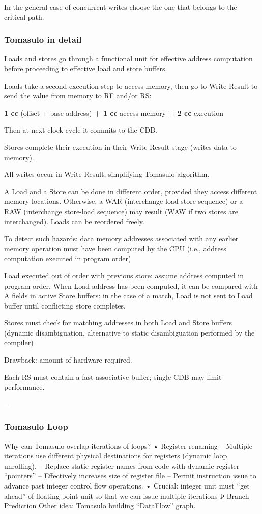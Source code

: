 In the general case of concurrent writes choose the one that belongs to the critical path.

\subsubsection{Tomasulo in detail}
Loads and stores go through a functional unit
for effective address computation before
proceeding to effective load and store buffers.

Loads take a second execution step to access
memory, then go to Write Result to send the
value from memory to RF and/or RS:
\begin{center}
    \textbf{1 cc} (offset + base address) \textbf{+ 1 cc} access memory \textbf{= 2 cc}
    execution
\end{center}
Then at next clock cycle it commits to the CDB\@.

Stores complete their execution in their Write
Result stage (writes data to memory).

All writes occur in Write Result, simplifying
Tomasulo algorithm.

A Load and a Store can be done in different
order, provided they access different memory
locations.
Otherwise, a WAR (interchange load-store
sequence) or a RAW (interchange store-load
sequence) may result (WAW if two stores are
interchanged).
Loads can be reordered freely.

To detect such hazards: data memory
addresses associated with any earlier memory
operation must have been computed by the
CPU (i.e., address computation executed in
program order)

Load executed out of order with previous store:
assume address computed in program order.
When Load address has been computed, it
can be compared with A fields in active Store
buffers: in the case of a match, Load is not sent
to Load buffer until conflicting store completes.

Stores must check for matching addresses in
both Load and Store buffers (dynamic
disambiguation, alternative to static
disambiguation performed by the compiler)

Drawback: amount of hardware required.

Each RS must contain a fast associative buffer;
single CDB may limit performance.

---

\subsubsection{Tomasulo Loop}
Why can Tomasulo overlap iterations of loops?
• Register renaming
– Multiple iterations use different physical destinations for registers
(dynamic loop unrolling).
– Replace static register names from code with dynamic register
“pointers”
– Effectively increases size of register file
– Permit instruction issue to advance past integer control flow
operations.
• Crucial: integer unit must “get ahead” of floating
point unit so that we can issue multiple iterations
Þ Branch Prediction
Other idea: Tomasulo building “DataFlow” graph.

